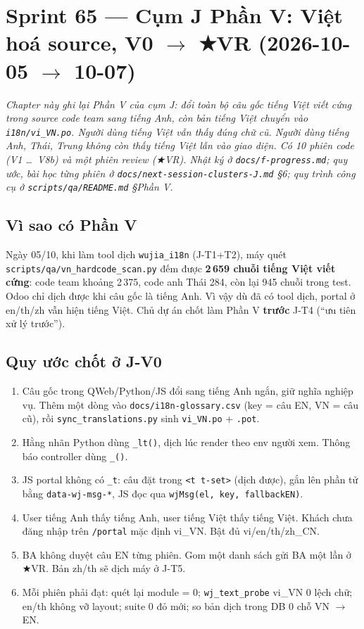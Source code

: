 \chapter{Sprint 65 --- Cụm J Phần V: Việt hoá source, V0 $\to$ ★VR (2026-10-05 $\to$ 10-07)}

\emph{Chapter này ghi lại Phần V của cụm J: đổi toàn bộ câu gốc tiếng Việt viết cứng trong source code team sang tiếng Anh,
còn bản tiếng Việt chuyển vào \texttt{i18n/vi\_VN.po}. Người dùng tiếng Việt vẫn thấy đúng chữ cũ. Người dùng tiếng Anh, Thái,
Trung không còn thấy tiếng Việt lẫn vào giao diện. Có 10 phiên code (V1 \ldots\ V8b) và một phiên review (★VR). Nhật ký ở
\texttt{docs/f-progress.md}; quy ước, bài học từng phiên ở \texttt{docs/next-session-clusters-J.md} §6; quy trình công cụ ở
\texttt{scripts/qa/README.md} §Phần V.}

\section{Vì sao có Phần V}

Ngày 05/10, khi làm tool dịch \texttt{wujia\_i18n} (J-T1+T2), máy quét \texttt{scripts/qa/vn\_hardcode\_scan.py} đếm được
\textbf{2\,659 chuỗi tiếng Việt viết cứng}: code team khoảng 2\,375, code anh Thái 284, còn lại 945 chuỗi trong test.
Odoo chỉ dịch được khi câu gốc là tiếng Anh. Vì vậy dù đã có tool dịch, portal ở en/th/zh vẫn hiện tiếng Việt.
Chủ dự án chốt làm Phần V \textbf{trước} J-T4 (``ưu tiên xử lý trước'').

\section{Quy ước chốt ở J-V0}

\begin{enumerate}[nosep]
\item Câu gốc trong QWeb/Python/JS đổi sang tiếng Anh ngắn, giữ nghĩa nghiệp vụ. Thêm một dòng vào \texttt{docs/i18n-glossary.csv}
  (key = câu EN, VN = câu cũ), rồi \texttt{sync\_translations.py} sinh \texttt{vi\_VN.po} + \texttt{.pot}.
\item Hằng nhãn Python dùng \texttt{\_lt()}, dịch lúc render theo env người xem. Thông báo controller dùng \texttt{\_()}.
\item JS portal không có \texttt{\_t}: câu đặt trong \texttt{<t t-set>} (dịch được), gắn lên phần tử bằng
  \texttt{data-wj-msg-*}, JS đọc qua \texttt{wjMsg(el, key, fallbackEN)}.
\item User tiếng Anh thấy tiếng Anh, user tiếng Việt thấy tiếng Việt. Khách chưa đăng nhập trên \texttt{/portal} mặc định vi\_VN.
  Bật đủ vi/en/th/zh\_CN.
\item BA không duyệt câu EN từng phiên. Gom một danh sách gửi BA một lần ở ★VR. Bản zh/th sẽ dịch máy ở J-T5.
\item Mỗi phiên phải đạt: quét lại module = 0; \texttt{wj\_text\_probe} vi\_VN 0 lệch chữ; en/th không vỡ layout; suite 0 đỏ mới;
  so bản dịch trong DB 0 chỗ VN $\to$ EN.
\end{enumerate}

